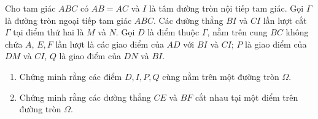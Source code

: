 \begin{ex}%
	Cho tam giác $ABC$ có $AB=AC$ và $I$ là tâm đường tròn nội tiếp tam giác. Gọi $\Gamma$ là đường tròn ngoại tiếp tam giác $ABC$. Các đường thẳng $BI$ và $CI$ lần lượt cắt $\Gamma$ tại điểm thứ hai là $M$ và $N$. Gọi $D$ là điểm thuộc $\Gamma$, nằm trên cung $BC$ không chứa $A$, $E, F$ lần lượt là các giao điểm của $AD$ với $BI$ và $CI$; $P$ là giao điểm của $DM$ và $CI$, $Q$ là giao điểm của $DN$ và $BI$.
	\begin{enumerate}[\indent a.]
		\item Chứng minh rằng các điểm $D, I, P, Q$ cùng nằm trên một đường tròn $\Omega$.
		\item Chứng minh rằng các đường thẳng $CE$ và $BF$ cắt nhau tại một điểm trên đường tròn $\Omega$.
	\end{enumerate}
\end{ex}
